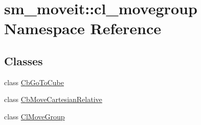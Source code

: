 \hypertarget{namespacesm__moveit_1_1cl__movegroup}{}\section{sm\+\_\+moveit\+:\+:cl\+\_\+movegroup Namespace Reference}
\label{namespacesm__moveit_1_1cl__movegroup}
\subsection*{Classes}
\begin{DoxyCompactItemize}
\item 
class \hyperlink{classsm__moveit_1_1cl__movegroup_1_1CbGoToCube}{Cb\+Go\+To\+Cube}
\item 
class \hyperlink{classsm__moveit_1_1cl__movegroup_1_1CbMoveCartesianRelative}{Cb\+Move\+Cartesian\+Relative}
\item 
class \hyperlink{classsm__moveit_1_1cl__movegroup_1_1ClMoveGroup}{Cl\+Move\+Group}
\end{DoxyCompactItemize}
